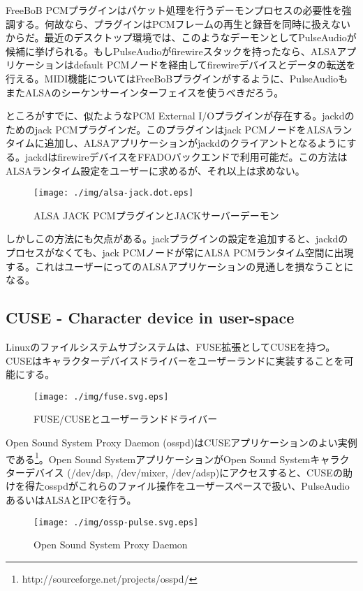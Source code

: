\documentclass[onecolumn]{jarticle}
\begin{document}
FreeBoB PCMプラグインはパケット処理を行うデーモンプロセスの必要性を強調する。何故なら、プラグインはPCMフレームの再生と録音を同時に扱えないからだ。最近のデスクトップ環境では、このようなデーモンとしてPulseAudioが候補に挙げられる。もしPulseAudioがfirewireスタックを持ったなら、ALSAアプリケーションはdefault PCMノードを経由してfirewireデバイスとデータの転送を行える。MIDI機能についてはFreeBoBプラグインがするように、PulseAudioもまたALSAのシーケンサーインターフェイスを使うべきだろう。

ところがすでに、似たようなPCM External I/Oプラグインが存在する。jackdのためのjack PCMプラグインだ。このプラグインはjack PCMノードをALSAランタイムに追加し、ALSAアプリケーションがjackdのクライアントとなるようにする。jackdはfirewireデバイスをFFADOバックエンドで利用可能だ。この方法はALSAランタイム設定をユーザーに求めるが、それ以上は求めない。

\begin{figure}[H]
	\centering
	\texttt{[image: ./img/alsa-jack.dot.eps]}
	\caption{{ALSA JACK PCMプラグインとJACKサーバーデーモン}}
	\label{alsa_jack}
\end{figure}

しかしこの方法にも欠点がある。jackプラグインの設定を追加すると、jackdのプロセスがなくても、jack PCMノードが常にALSA PCMランタイム空間に出現する。これはユーザーにってのALSAアプリケーションの見通しを損なうことになる。


\subsection{CUSE - Character device in user-space}
Linuxのファイルシステムサブシステムは、FUSE拡張としてCUSEを持つ。CUSEはキャラクターデバイスドライバーをユーザーランドに実装することを可能にする。

\begin{figure}[H]
	\centering
	\texttt{[image: ./img/fuse.svg.eps]}
	\caption{{FUSE/CUSEとユーザーランドドライバー}}
	\label{fuse}
\end{figure}

Open Sound System Proxy Daemon (osspd)はCUSEアプリケーションのよい実例である\footnote{http://sourceforge.net/projects/osspd/}。Open Sound SystemアプリケーションがOpen Sound Systemキャラクターデバイス (/dev/dsp, /dev/mixer, /dev/adsp)にアクセスすると、CUSEの助けを得たosspdがこれらのファイル操作をユーザースペースで扱い、PulseAudioあるいはALSAとIPCを行う。

\begin{figure}[H]
	\centering
	\texttt{[image: ./img/ossp-pulse.svg.eps]}
	\caption{{Open Sound System Proxy Daemon}}
	\label{osspd_pulse}
\end{figure}
\end{document}
